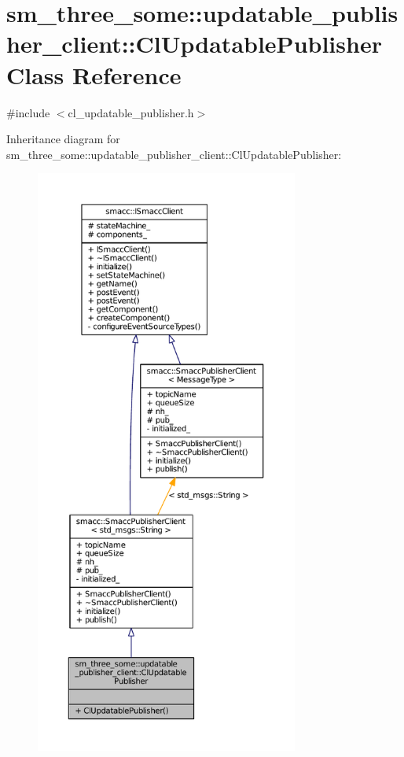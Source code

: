 \hypertarget{classsm__three__some_1_1updatable__publisher__client_1_1ClUpdatablePublisher}{}\section{sm\+\_\+three\+\_\+some\+:\+:updatable\+\_\+publisher\+\_\+client\+:\+:Cl\+Updatable\+Publisher Class Reference}
\label{classsm__three__some_1_1updatable__publisher__client_1_1ClUpdatablePublisher}


{\ttfamily \#include $<$cl\+\_\+updatable\+\_\+publisher.\+h$>$}



Inheritance diagram for sm\+\_\+three\+\_\+some\+:\+:updatable\+\_\+publisher\+\_\+client\+:\+:Cl\+Updatable\+Publisher\+:
\nopagebreak
\begin{figure}[H]
\begin{center}
\leavevmode
\includegraphics[height=550pt]{classsm__three__some_1_1updatable__publisher__client_1_1ClUpdatablePublisher__inherit__graph}
\end{center}
\end{figure}


